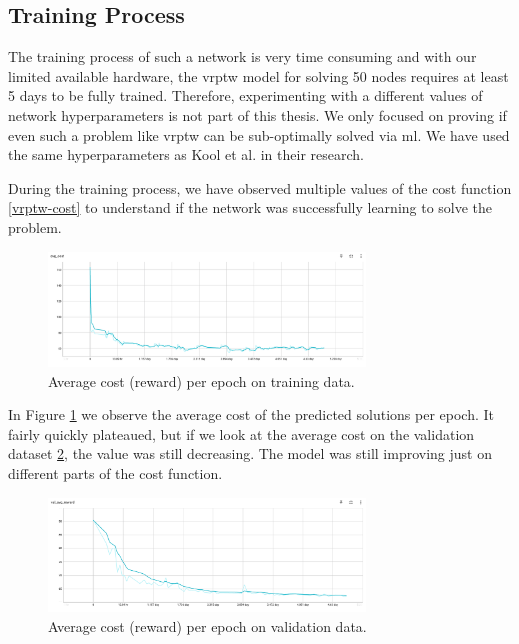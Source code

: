 \subsection{Training Process}

The training process of such a network is very time consuming and with our limited available hardware, the \gls{vrptw} model for solving 50 nodes requires at least 5 days to be fully trained. Therefore, experimenting with a different values of network hyperparameters is not part of this thesis. We only focused on proving if even such a problem like \gls{vrptw} can be sub-optimally solved via \gls{ml}. We have used the same hyperparameters as Kool et al. \cite{attention-route} in their research.

During the training process, we have observed multiple values of the cost function \ref{vrptw-cost} to understand if the network was successfully learning to solve the problem.

\begin{figure}[ht]
    \centering
    \includegraphics[width=0.75\textwidth]{resources/evaluation/avg-cost.png}
    \caption{Average cost (reward) per epoch on training data.}
    \label{fig:avg-cost}
\end{figure}

In Figure \ref{fig:avg-cost} we observe the average cost of the predicted solutions per epoch. It fairly quickly plateaued, but if we look at the average cost on the validation dataset \ref{fig:avg-cost-val}, the value was still decreasing. The model was still improving just on different parts of the cost function. 

\begin{figure}[ht]
    \centering
    \includegraphics[width=0.75\textwidth]{resources/evaluation/val-avg-cost.png}
    \caption{Average cost (reward) per epoch on validation data.}
    \label{fig:avg-cost-val}
\end{figure}


